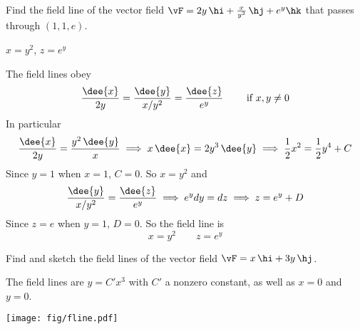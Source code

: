 \begin{question}[M317 2003A] %
Find the field line of the vector field
$\vF= 2y\,\hi+ \frac{x}{y^2}\,\hj+e^y\hk$ that passes through
$(1,1,e)$.
\end{question}


\begin{answer} 
$x=y^2$, $z=e^y$
\end{answer}

\begin{solution} 
The field lines obey
\begin{equation*}
\frac{\dee{x}}{2y}=\frac{\dee{y}}{x/y^2}=\frac{\dee{z}}{e^y}
\qquad\text{ if $x,y\ne 0$}
\end{equation*}
In particular
\begin{align*}
\frac{\dee{x}}{2y}=\frac{y^2\,\dee{y}}{x}
\implies
x\,\dee{x}=2y^3\,\dee{y}
\implies
\frac{1}{2}x^2=\frac{1}{2}y^4+C
\end{align*}
Since $y=1$ when $x=1$, $C=0$. So $x=y^2$ and
\begin{equation*}
\frac{\dee{y}}{x/y^2}=\frac{\dee{z}}{e^y}
\implies
e^ydy=dz
\implies
z=e^y+D
\end{equation*}
Since $z=e$ when $y=1$, $D=0$. So the field line is
\begin{equation*}
x=y^2 \qquad z=e^y
\end{equation*}
\end{solution}

\begin{question}[M317 2001A] %
 Find and sketch the field lines of the vector field
$\vF= x\,\hi+ 3y\,\hj$.
\end{question}


\begin{answer}
The field lines are $y=C'x^3$ with $C'$ a nonzero constant,
as well as $x=0$ and $y=0$.

\begin{center}
   \texttt{[image: fig/fline.pdf]}
\end{center}

\end{answer}

